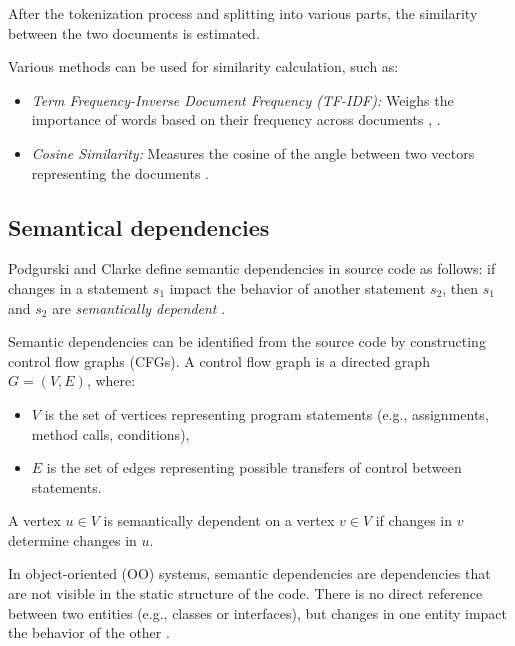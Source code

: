 After the tokenization process and splitting into various parts, the similarity between the two documents is estimated. 

Various methods can be used for similarity calculation, such as:
\begin{itemize}
    \item \textit{Term Frequency-Inverse Document Frequency (TF-IDF):} Weighs the importance of words based on their frequency across documents \cite{lexical-dep}, \cite{lexical-dep-Corazza}.
    \item \textit{Cosine Similarity:} Measures the cosine of the angle between two vectors representing the documents \cite{lexical-dep-Prajapati}.
\end{itemize}






\subsection{Semantical dependencies}

\hspace{4em} Podgurski and Clarke define semantic dependencies in source code as follows: if changes in a statement \(s_1\) impact the behavior of another statement \(s_2\), then \(s_1\) and \(s_2\) are \emph{semantically dependent} \cite{Podgurski-semantic}.

Semantic dependencies can be identified from the source code by constructing control flow graphs (CFGs). A control flow graph is a directed graph \(G = (V, E)\), where:
\begin{itemize}
    \item \(V\) is the set of vertices representing program statements (e.g., assignments, method calls, conditions),
    \item \(E\) is the set of edges representing possible transfers of control between statements.
\end{itemize}

A vertex \(u \in V\) is semantically dependent on a vertex \(v \in V\) if changes in \(v\) determine changes in \(u\).

In object-oriented (OO) systems, semantic dependencies are dependencies that are not visible in the static structure of the code. There is no direct reference between two entities (e.g., classes or interfaces), but changes in one entity impact the behavior of the other \cite{Neto-semantic-dep, Capiluppi-semantic-dep, Poshyvanyk2009}. 


